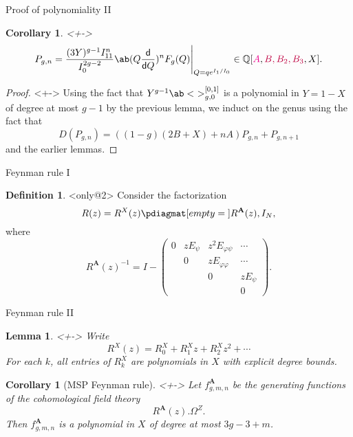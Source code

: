 \documentclass[10pt]{beamer}
\newcommand{\Q}{\mathbb{Q}}
\newcommand{\bA}{\mathbf{A}}
\newcommand{\1}{\mathbf{1}}
\newcommand{\2}{\mathbf{2}}
\newcommand{\3}{\mathbf{3}}
\newtheorem{cor}[thm]{Corollary}
\newtheorem{lem}[thm]{Lemma}
\theoremstyle{definition}
\newtheorem{defn}[thm]{Definition}
\theoremstyle{remark}
\theoremstyle{plain}
\theoremstyle{definition}
\theoremstyle{remark}
\begin{document}
\begin{frame}{Proof of polynomiality II}
  \begin{cor}<+->
    \[ P_{g,n} = \frac{(3Y)^{g-1} I_{11}^n}{I_0^{2g-2}} \ab(Q \odv[style-inf=\mathsf{d}]{}{Q})^n F_g(Q) \Bigg|_{Q=qe^{I_1/I_0}} \in \Q[\mathcolor{magenta}{A}, \mathcolor{purple}{B, B_2, B_3}, X]. \]
  \end{cor}
  \begin{proof}<+->
    Using the fact that $Y^{g-1}\ab<\ >_{g,0}^{[0,1]}$ is a polynomial in $Y=1-X$ of degree at most $g-1$ by the previous lemma, we induct on the genus using the fact that 
    \[ D(P_{g,n}) = ((1-g)(2B+X) + nA) P_{g,n} + P_{g,n+1} \]
    and the earlier lemmas.
  \end{proof}
\end{frame}

\begin{frame}{Feynman rule I}

  \begin{defn}<only@2>
    Consider the factorization
    \[ R(z) = R^X(z)\pdiagmat[empty={}]{R^{\bA}(z), I_N},\]
    where
    \[ R^{\bA}(z)^{-1} = I - \begin{pmatrix}
      0 & z E_{\psi} & z^2 E_{\varphi\psi} & \cdots \\
      & 0 & z E_{\varphi\varphi} & \cdots \\
      & & 0 & z E_{\psi} \\
      & & & 0
    \end{pmatrix}. \]
  \end{defn}
\end{frame}

\begin{frame}{Feynman rule II}
  \begin{lem}<+->
    Write
    \[ R^X(z) = R^X_0 + R_1^X z + R_2^X z^2 + \cdots \]
    For each $k$, all entries of $R_k^X$ are polynomials in $X$ with explicit degree bounds.
  \end{lem}
  \begin{cor}[MSP Feynman rule]<+->
    Let $f_{g,m,n}^{\bA}$ be the generating functions of the cohomological field theory
    \[ R^{\bA}(z).\Omega^Z. \]
    Then $f_{g,m,n}^{\bA}$ is a polynomial in $X$ of degree at most $3g-3+m$.
  \end{cor}
\end{frame}
\end{document}
